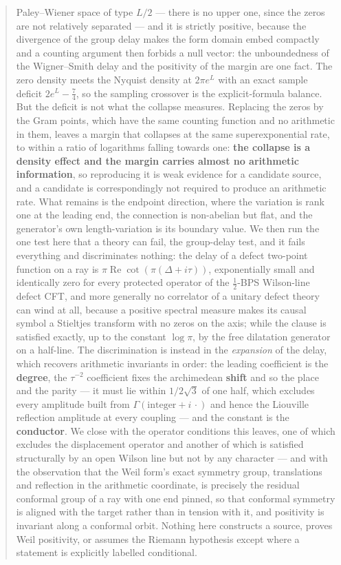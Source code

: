 \documentclass[11pt]{article}
\numberwithin{equation}{section}
\theoremstyle{definition}
\theoremstyle{remark}
\newcommand{\re}{\operatorname{Re}}
\begin{document}
\begin{abstract}
Paley--Wiener space of type $L/2$ --- there is no upper one, since the zeros are
not relatively separated --- and it is strictly positive, because the divergence
of the group delay makes the form domain embed compactly and a counting argument
then forbids a null vector: the unboundedness of the Wigner--Smith delay and the
positivity of the margin are one fact. The zero density meets the Nyquist density
at $2\pi e^L$ with an exact sample deficit $2e^L-\frac74$, so the sampling
crossover is the explicit-formula balance. But the deficit is not what the
collapse measures. Replacing the zeros by the Gram points, which have the same
counting function and no arithmetic in them, leaves a margin that collapses at the
same superexponential rate, to within a ratio of logarithms falling towards one:
\textbf{the collapse is a density effect and the margin carries almost no
arithmetic information}, so reproducing it is weak evidence for a candidate
source, and a candidate is correspondingly not required to produce an arithmetic
rate. What remains is the endpoint direction, where the variation is rank one at
the leading end,
the connection is non-abelian but flat, and the generator's own length-variation
is its boundary value. We then run the one test here that a theory can fail, the group-delay test, and
it fails everything and discriminates nothing: the delay of a defect two-point
function on a ray is $\pi\re\cot(\pi(\Delta+i\tau))$, exponentially small and
identically zero for every protected operator of the $\frac12$-BPS Wilson-line
defect CFT, and more generally no correlator of a unitary defect theory can wind
at all, because a positive spectral measure makes its causal symbol a Stieltjes
transform with no zeros on the axis; while the clause is satisfied exactly, up to
the constant $\log\pi$, by the free dilatation generator on a half-line. The
discrimination is instead in the \emph{expansion} of the delay, which recovers
arithmetic invariants in order: the leading coefficient is the \textbf{degree},
the $\tau^{-2}$ coefficient fixes the archimedean \textbf{shift} and so the place
and the parity --- it must lie within $1/2\sqrt3$ of one half, which excludes
every amplitude built from $\Gamma(\text{integer}+i\,\cdot)$ and hence the
Liouville reflection amplitude at every coupling --- and the constant is the
\textbf{conductor}. We close with the operator conditions this leaves, one of
which excludes the displacement operator and another of which is satisfied
structurally by an open Wilson line but not by any character --- and with the
observation that the Weil form's exact symmetry group, translations and
reflection in the arithmetic coordinate, is precisely the residual conformal
group of a ray with one end pinned, so that conformal symmetry is aligned with
the target rather than in tension with it, and positivity is invariant along a
conformal orbit. Nothing here
constructs a source, proves Weil positivity, or assumes the Riemann hypothesis
except where a statement is explicitly labelled conditional.
\end{abstract}
\end{document}
